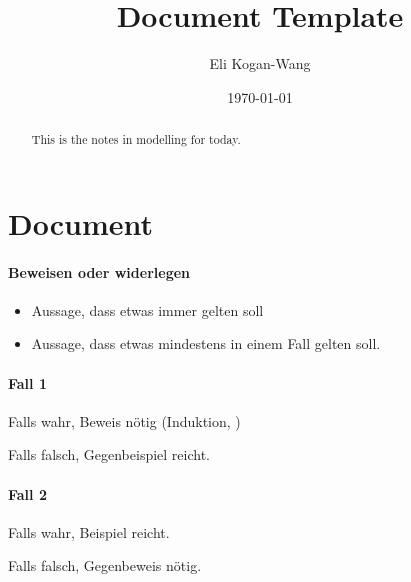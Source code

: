 \documentclass[a4paper,12pt]{article}
\title{Document Template}
\author{Eli Kogan-Wang}
\date{\today}
\begin{document}
\renewcommand{\abstractname}{Abstract}
\begin{abstract}
    This is the notes in modelling for today.
\end{abstract}
\section{Document}

\paragraph*{Beweisen oder widerlegen}

\begin{itemize}
    \item Aussage, dass etwas immer gelten soll
    \item Aussage, dass etwas mindestens in einem Fall gelten soll.
\end{itemize}

\paragraph*{Fall 1}

Falls wahr, Beweis nötig (Induktion, )

Falls falsch, Gegenbeispiel reicht.

\paragraph*{Fall 2}

Falls wahr, Beispiel reicht.

Falls falsch, Gegenbeweis nötig.
\end{document}
